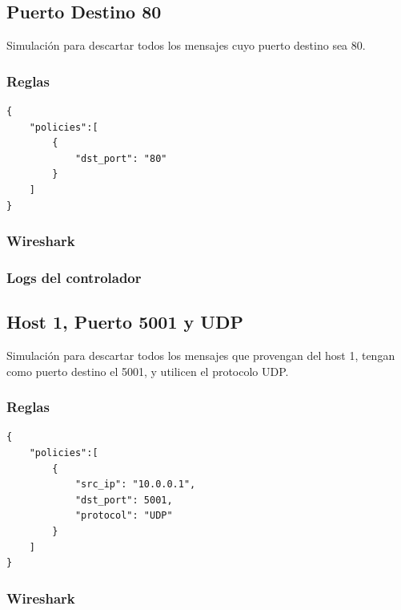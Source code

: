 \documentclass{article}
\begin{document}
\subsection{Puerto Destino 80}
Simulación para descartar todos los mensajes cuyo puerto destino sea 80.

\subsubsection{Reglas}
\begin{verbatim}
{
    "policies":[
        {
            "dst_port": "80"
        }
    ]
}
\end{verbatim}

\subsubsection{Wireshark}
\begin{center}
\end{center}

\subsubsection{Logs del controlador}
\begin{center}
\end{center}

\subsection{Host 1, Puerto 5001 y UDP}
Simulación para descartar todos los mensajes que provengan del host 1, tengan como puerto destino el 5001, y utilicen el protocolo UDP.

\subsubsection{Reglas}
\begin{verbatim}
{
    "policies":[
        {
            "src_ip": "10.0.0.1",
            "dst_port": 5001,
            "protocol": "UDP"
        }
    ]
}
\end{verbatim}

\subsubsection{Wireshark}
\begin{center}
\end{center}
\end{document}
